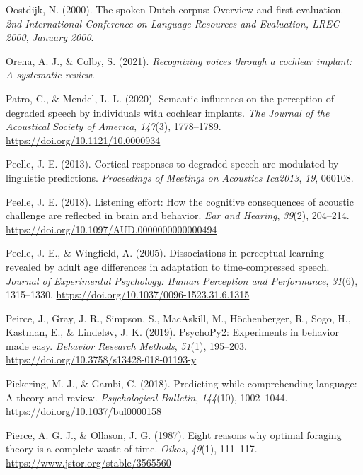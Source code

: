 \documentclass[a4paper, nobind]{templates/ociamthesis}
\newlength{\cslhangindent}
\newenvironment{CSLReferences}[2] %
 {%
  \setlength{\parindent}{0pt}
  \ifodd #1
  \let\oldpar\par
  \def\par{\hangindent=\cslhangindent\oldpar}
  \fi
  \setlength{\parskip}{1mm}
  \setlength{\baselineskip}{6mm}
 }%
 {}
\begin{document}
\begin{CSLReferences}{1}{0}
\leavevmode{}%
Oostdijk, N. (2000). {The spoken Dutch corpus: Overview and first evaluation}. \emph{2nd International Conference on Language Resources and Evaluation, LREC 2000}, \emph{January 2000}.

\leavevmode{}%
Orena, A. J., \& Colby, S. (2021). \emph{Recognizing voices through a cochlear implant: A systematic review}.

\leavevmode{}%
Patro, C., \& Mendel, L. L. (2020). Semantic influences on the perception of degraded speech by individuals with cochlear implants. \emph{The Journal of the Acoustical Society of America}, \emph{147}(3), 1778--1789. \url{https://doi.org/10.1121/10.0000934}

\leavevmode{}%
Peelle, J. E. (2013). Cortical responses to degraded speech are modulated by linguistic predictions. \emph{Proceedings of Meetings on Acoustics Ica2013}, \emph{19}, 060108.

\leavevmode{}%
Peelle, J. E. (2018). {Listening effort: How the cognitive consequences of acoustic challenge are reflected in brain and behavior}. \emph{Ear and Hearing}, \emph{39}(2), 204--214. \url{https://doi.org/10.1097/AUD.0000000000000494}

\leavevmode{}%
Peelle, J. E., \& Wingfield, A. (2005). {Dissociations in perceptual learning revealed by adult age differences in adaptation to time-compressed speech}. \emph{Journal of Experimental Psychology: Human Perception and Performance}, \emph{31}(6), 1315--1330. \url{https://doi.org/10.1037/0096-1523.31.6.1315}

\leavevmode{}%
Peirce, J., Gray, J. R., Simpson, S., MacAskill, M., Höchenberger, R., Sogo, H., Kastman, E., \& Lindeløv, J. K. (2019). {PsychoPy2: Experiments in behavior made easy}. \emph{Behavior Research Methods}, \emph{51}(1), 195--203. \url{https://doi.org/10.3758/s13428-018-01193-y}

\leavevmode{}%
Pickering, M. J., \& Gambi, C. (2018). Predicting while comprehending language: A theory and review. \emph{Psychological Bulletin}, \emph{144}(10), 1002--1044. \url{https://doi.org/10.1037/bul0000158}

\leavevmode{}%
Pierce, A. G. J., \& Ollason, J. G. (1987). {Eight reasons why optimal foraging theory is a complete waste of time}. \emph{Oikos}, \emph{49}(1), 111--117. \url{https://www.jstor.org/stable/3565560}


\end{CSLReferences}
\end{document}
